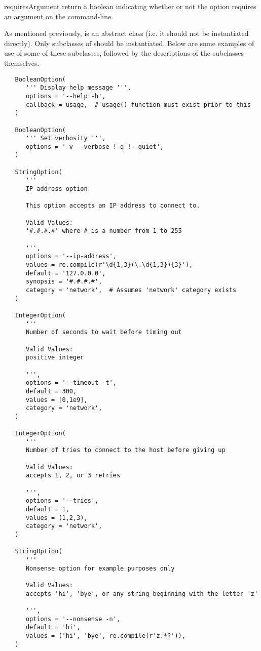 \documentclass{manual}
\begin{document}
\begin{methoddesc}[GenericOption]{requiresArgument}{}
return a boolean indicating whether or not the option requires an argument
on the command-line.
\end{methoddesc}

As mentioned previously,  is an abstract class 
(i.e. it should not be instantiated directly).  Only subclasses of 
 should be instantiated.  Below are some examples
of use of some of these subclasses, followed by the descriptions
of the subclasses themselves.

\begin{verbatim}
   BooleanOption(
      ''' Display help message ''',
      options = '--help -h',
      callback = usage,  # usage() function must exist prior to this
   )

   BooleanOption(
      ''' Set verbosity ''',
      options = '-v --verbose !-q !--quiet',
   )

   StringOption(
      '''
      IP address option

      This option accepts an IP address to connect to.

      Valid Values:
      '#.#.#.#' where # is a number from 1 to 255

      ''',
      options = '--ip-address',
      values = re.compile(r'\d{1,3}(\.\d{1,3}){3}'),
      default = '127.0.0.0',
      synopsis = '#.#.#.#',
      category = 'network',  # Assumes 'network' category exists
   )

   IntegerOption(
      '''
      Number of seconds to wait before timing out

      Valid Values:
      positive integer

      ''',
      options = '--timeout -t',
      default = 300,
      values = [0,1e9],
      category = 'network',
   )

   IntegerOption(
      '''
      Number of tries to connect to the host before giving up

      Valid Values:
      accepts 1, 2, or 3 retries

      ''',
      options = '--tries',
      default = 1,
      values = (1,2,3),
      category = 'network',
   )

   StringOption(
      '''
      Nonsense option for example purposes only

      Valid Values:
      accepts 'hi', 'bye', or any string beginning with the letter 'z'

      ''',
      options = '--nonsense -n',
      default = 'hi',
      values = ('hi', 'bye', re.compile(r'z.*?')),
   )
\end{verbatim}
\end{document}
